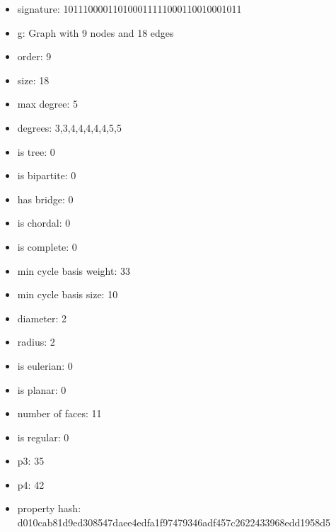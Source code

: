 \newpage
\begin{figure}
\end{figure}
\begin{itemize}
\item signature: 101110000110100011111000110010001011
\item g: Graph with 9 nodes and 18 edges
\item order: 9
\item size: 18
\item max degree: 5
\item degrees: 3,3,4,4,4,4,4,5,5
\item is tree: 0
\item is bipartite: 0
\item has bridge: 0
\item is chordal: 0
\item is complete: 0
\item min cycle basis weight: 33
\item min cycle basis size: 10
\item diameter: 2
\item radius: 2
\item is eulerian: 0
\item is planar: 0
\item number of faces: 11
\item is regular: 0
\item p3: 35
\item p4: 42
\item property hash: d010cab81d9ed308547daee4edfa1f97479346adf457c2622433968edd1958d5
\end{itemize}

